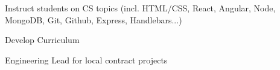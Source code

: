 \documentclass[letterpaper]{deedy-resume} %
\begin{document}
\begin{minipage}[t]{0.66\textwidth}
  \sectionspace %


  \begin{tightitemize}
  \item Instruct students on CS topics (incl. HTML/CSS, React, Angular, Node, MongoDB, Git, Github, Express, Handlebars...)
  \item Develop Curriculum
  \item Engineering Lead for local contract projects
  \end{tightitemize}

  \sectionspace %










\end{minipage} %
\end{document}
